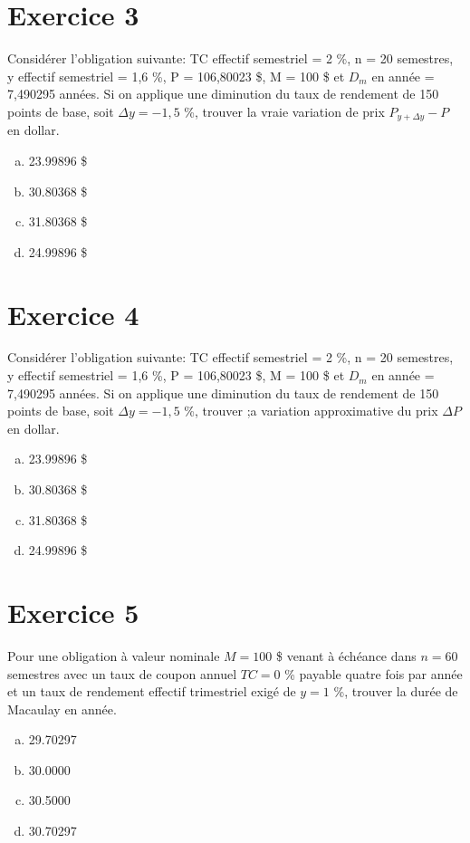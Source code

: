 \documentclass[10pt,a4paper]{article}
\begin{document}
\section*{Exercice 3}
Considérer l’obligation suivante: TC effectif semestriel = 2 \%, n = 20 semestres, y effectif semestriel = 1,6 \%, P = 106,80023 \$, M = 100 \$ et $D_m$ en année = 7,490295 années.  Si on applique une diminution du taux de rendement de 150 points de base,  soit $\Delta y = -1,5$ \%,  trouver la vraie variation de prix $P_{y+\Delta y} - P$ en dollar.


\begin{enumerate}[a)]
\item 23.99896 \$ 
\item 30.80368 \$
\item 31.80368 \$
\item  24.99896 \$
\end{enumerate}

\newpage

\section*{Exercice 4}
Considérer l’obligation suivante: TC effectif semestriel = 2 \%, n = 20 semestres, y effectif semestriel = 1,6 \%, P = 106,80023 \$, M = 100 \$ et $D_m$ en année = 7,490295 années.  Si on applique une diminution du taux de rendement de 150 points de base,  soit $\Delta y = -1,5$ \%,  trouver ;a variation approximative du prix $\Delta P$ en dollar.


\begin{enumerate}[a)]
\item 23.99896 \$
\item 30.80368 \$
\item 31.80368 \$
\item  24.99896 \$
\end{enumerate}


\section*{Exercice 5}
Pour une obligation à valeur nominale $M = 100$ \$ venant à échéance dans $n = 60$ semestres avec un taux de coupon annuel $TC = 0$ \% payable quatre fois par année et un taux de rendement effectif trimestriel exigé de $y = 1$ \%,  trouver la durée de Macaulay en année.


\begin{enumerate}[a)]
\item 29.70297 
\item 30.0000
\item 30.5000
\item 30.70297 
\end{enumerate}
\end{document}
